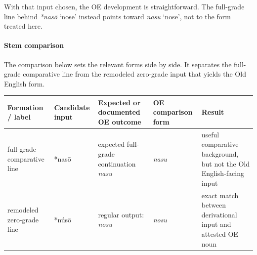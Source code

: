 \documentclass[
  british,
  a4paper,
]{article}
\newcounter{none} %
\providecommand{\Recon}[1]{\emph{*#1}}
\begin{document}
With that input chosen, the OE development is straightforward. The
full-grade line behind \Recon{nasō} `nose' instead points toward
{\emph{nasu}} `nose', not to the form treated here.

\paragraph{Stem comparison}\label{stem-comparison-4}

The comparison below sets the relevant forms side by side. It separates
the full-grade comparative line from the remodeled zero-grade input that
yields the Old English form.

{\def\LTcaptype{none} %
\begin{longtable}[]{@{}
  >{\raggedright\arraybackslash}p{}
  >{\raggedright\arraybackslash}p{}
  >{\raggedright\arraybackslash}p{}
  >{\raggedright\arraybackslash}p{}
  >{\raggedright\arraybackslash}p{}@{}}
\toprule\noalign{}
\begin{minipage}[b]{\linewidth}\raggedright
Formation / label
\end{minipage} & \begin{minipage}[b]{\linewidth}\raggedright
Candidate input
\end{minipage} & \begin{minipage}[b]{\linewidth}\raggedright
Expected or documented OE outcome
\end{minipage} & \begin{minipage}[b]{\linewidth}\raggedright
OE comparison form
\end{minipage} & \begin{minipage}[b]{\linewidth}\raggedright
Result
\end{minipage} \\
\midrule\noalign{}
\endhead
\bottomrule\noalign{}
\endlastfoot
full-grade comparative line & *nasō & expected full-grade continuation
\emph{nasu} & \emph{nasu} & useful comparative background, but not the
Old English-facing input \\
remodeled zero-grade line & *núsō & regular output: \emph{nosu} &
\emph{nosu} & exact match between derivational input and attested OE
noun \\
\end{longtable}
}
\end{document}
